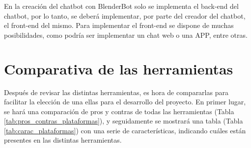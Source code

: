 En la creación del chatbot con BlenderBot solo se implementa el \gls{back-end} del chatbot, por lo tanto, se deberá implementar, por parte del creador del chatbot, el \gls{front-end} del mismo. Para implementar el \gls{front-end} se dispone de muchas posibilidades, como podría ser implementar un chat web o una APP, entre otras.




\section{Comparativa de las herramientas}

Después de revisar las distintas herramientas, es hora de compararlas para facilitar la elección de una ellas para el desarrollo del proyecto. En primer lugar, se hará una comparación de pros y contras de todas las herramientas (Tabla \ref{tab:pros_contras_plataformas}), y seguidamente se mostrará una tabla (Tabla \ref{tab:carac_plataformas}) con una serie de características, indicando cuáles están presentes en las distintas herramientas.


